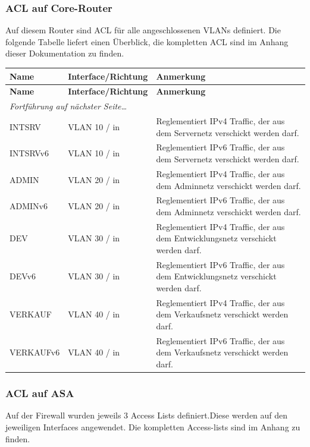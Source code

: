 \documentclass[11pt,a4paper,parskip=half]{scrartcl}
\begin{document}
\subsubsection{ACL auf Core-Router}
Auf diesem Router sind ACL für alle angeschlossenen VLANs definiert. Die folgende Tabelle liefert einen Überblick, die kompletten ACL sind im Anhang dieser Dokumentation zu finden.
\begin{longtable}{p{2.5cm}|p{3.5cm}|p{7cm}}
	\textbf{Name} & \textbf{Interface/Richtung} & \textbf{Anmerkung}\\
	\hline
	\endfirsthead
	\textbf{Name} & \textbf{Interface/Richtung} & \textbf{Anmerkung}\\
	\hline
	\endhead
	\hline
	\multicolumn{2}{l}{\textit{Fortführung auf nächster Seite\ldots}} \\
	\endfoot
	\endlastfoot
	INTSRV & VLAN 10 / in & Reglementiert IPv4 Traffic, der aus dem Servernetz verschickt werden darf.\\
	INTSRVv6 & VLAN 10 / in & Reglementiert IPv6 Traffic, der aus dem Servernetz verschickt werden darf.\\
	ADMIN & VLAN 20 / in & Reglementiert IPv4 Traffic, der aus dem Adminnetz verschickt werden darf.\\
	ADMINv6 & VLAN 20 / in & Reglementiert IPv6 Traffic, der aus dem Adminnetz verschickt werden darf.\\
	DEV & VLAN 30 / in & Reglementiert IPv4 Traffic, der aus dem Entwicklungsnetz verschickt werden darf.\\
	DEVv6 & VLAN 30 / in & Reglementiert IPv6 Traffic, der aus dem Entwicklungsnetz verschickt werden darf.\\
	VERKAUF & VLAN 40 / in & Reglementiert IPv4 Traffic, der aus dem Verkaufsnetz verschickt werden darf.\\
	VERKAUFv6 & VLAN 40 / in & Reglementiert IPv6 Traffic, der aus dem Verkaufsnetz verschickt werden darf.\\
\end{longtable}

\subsubsection{ACL auf ASA}
Auf der Firewall wurden jeweils 3 Access Lists definiert.Diese werden auf den jeweiligen Interfaces angewendet. Die kompletten Access-lists sind im Anhang zu finden.
\end{document}

